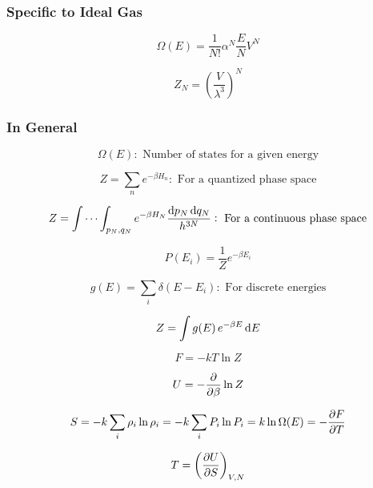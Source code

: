 \documentclass{article}
\begin{document}
\subsubsection{Specific to Ideal Gas}
\begin{equation}
	\Omega(E)=\frac{1}{N!}\alpha^N \frac{E}{N}V^N
\end{equation}

\begin{equation}
	Z_N=\left(\frac{V}{\lambda^3}\right)^N
\end{equation}
\subsubsection{In General}
\begin{equation}
	\Omega(E): \text{   Number of states for a given energy}
\end{equation}

\begin{equation}
	Z=\sum_n e^{-\beta H_n}: \text{   For a quantized phase space}
\end{equation}

\begin{equation}
	Z=\idotsint_{p_N, q_N} e^{-\beta H_N} \frac{\dif p_N \dif q_N}{h^{3N}}: \text{   For a continuous phase space}
\end{equation}

\begin{equation}
	P(E_i)=\frac{1}{Z}e^{-\beta E_i}
\end{equation}

\begin{equation}
	g(E)=\sum_i \delta(E-E_i): \text{   For discrete energies}
\end{equation}

\begin{equation}
	Z=\int g(E) \, e^{-\beta E}\dif E
\end{equation}

\begin{equation}
	F=-kT\ln Z
\end{equation}

\begin{equation}
	U=-\pdv{\beta}\ln Z
\end{equation}

\begin{equation}
	S=-k\sum_i \rho_i \ln \rho_i=-k\sum_i P_i \ln P_i=k\ln\Omega(E)=-\pdv{F}{T}
\end{equation}

\begin{equation}
	T=\left(\pdv{U}{S}\right)_{V, N}
\end{equation}
\end{document}
